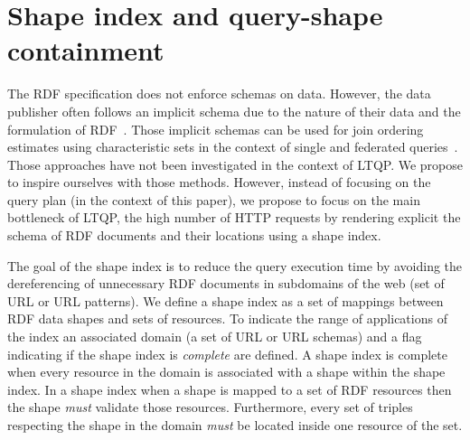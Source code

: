 \section{Shape index and query-shape containment}



The RDF specification does not enforce schemas on data.
However, the data publisher often follows an implicit schema due to the nature of their data and the formulation of RDF~\cite{Neumann2011CharacteristicSA}.
Those implicit schemas can be used  for join ordering estimates using characteristic sets in the context of single and federated queries~\cite{Neumann2011CharacteristicSA, Meimaris2017ExtendedCS, Meimaris2018HierarchicalCS}.
Those approaches have not been investigated in the context of LTQP.
We propose to inspire ourselves with those methods.
However, instead of focusing on the query plan (in the context of this paper), we propose to focus on the main bottleneck of LTQP, the high number of HTTP requests by rendering explicit the schema of RDF documents and their locations using a shape index.

The goal of the shape index is to reduce the query execution time by avoiding the dereferencing of unnecessary RDF documents in subdomains of the web (set of URL or URL patterns).
We define a shape index as a set of mappings between RDF data shapes and sets of resources.
To indicate the range of applications of the index an associated domain (a set of URL or URL schemas) and a flag indicating if the shape index is \emph{complete} are defined.
A shape index is complete when every resource in the domain is associated with a shape within the shape index.
In a shape index when a shape is mapped to a set of RDF resources then the shape \emph{must} validate those resources.
Furthermore, every set of triples respecting the shape in the domain \emph{must} be located inside one resource of the set.

